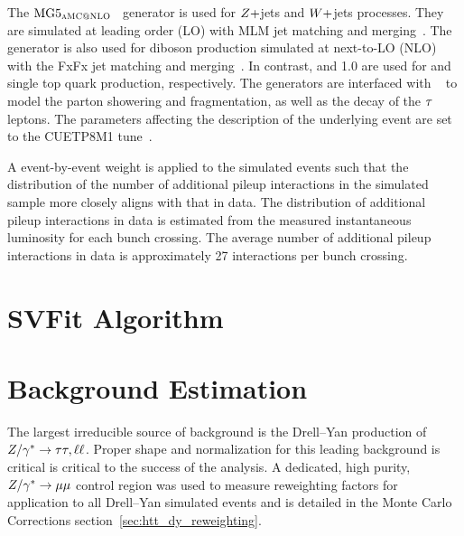 The $\text{MG5}_\textsc{aMC@NLO}$~\cite{Alwall:2014hca} generator is used for $Z+$jets and $W+$jets processes. 
They are simulated at leading order (LO) with MLM jet matching and merging~\cite{Alwall:2007fs}.
The \aMCATNLO generator is also used for diboson production simulated at next-to-LO (NLO) with the 
FxFx jet matching and merging~\cite{Frederix:2012ps}. In contrast,  and 1.0 are used for \ttbar
and single top quark production, respectively. The generators are interfaced with  ~\cite{Sjostrand:2014zea} to model the parton showering and fragmentation, as well as 
the decay of the $\tau$ leptons. The \PYTHIA parameters affecting the description of the 
underlying event are set to the {CUETP8M1} tune~\cite{Khachatryan:2015pea}.

A event-by-event weight is applied to the simulated events such that the distribution of the 
number of additional pileup interactions in the simulated sample more closely aligns with that in data.
The distribution of additional pileup interactions in data is estimated from the measured instantaneous 
luminosity for each bunch crossing. The average number of additional pileup interactions in
data is approximately 27 interactions per bunch crossing.



\section{SVFit Algorithm}



\section{Background Estimation}
\label{sec:background_estimation}
The largest irreducible source of background is the Drell--Yan production
of $Z/\gamma^*\to\tau\tau, \ell\ell$. Proper shape and normalization for this
leading background is critical is critical to the success of the analysis.
A dedicated, high purity, $Z/\gamma^*\to\mu\mu$ control region was
used to measure reweighting factors for application to all Drell--Yan
simulated events and is detailed in the Monte Carlo Corrections 
section~\ref{sec:htt_dy_reweighting}.

